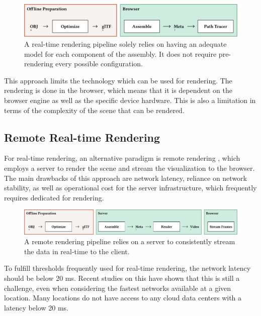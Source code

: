 \begin{figure}[H]
  \includegraphics[width=\columnwidth]{resources/cad-pipeline-online.png}
  \caption{A real-time rendering pipeline solely relies on having an adequate model for each component of the assembly. It does not require pre-rendering every possible configuration.}
  \label{fig:cad-online}
\end{figure}

This approach limits the technology which can be used for rendering. The rendering is done in the browser, which means that it is dependent on the browser engine as well as the specific device hardware. This is also a limitation in terms of the complexity of the scene that can be rendered.

\subsection*{Remote Real-time Rendering}

For real-time rendering, an alternative paradigm is remote rendering \cite{remoteRendering}, which employs a server to render the scene and stream the visualization to the browser. The main drawbacks of this approach are network latency, reliance on network stability, as well as operational cost for the server infrastructure, which frequently requires dedicated  for rendering.

\begin{figure}[H]
  \includegraphics[width=\columnwidth]{resources/cad-pipeline-remote.png}
  \caption{A remote rendering pipeline relies on a server to consistently stream the data in real-time to the client.}
  \label{fig:cad-remote}
\end{figure}

To fulfill thresholds frequently used for real-time rendering, the network latency should be below 20 ms. Recent studies on this have shown that this is still a challenge, even when considering the fastest networks available at a given location. Many locations do not have access to any cloud data centers with a latency below 20 ms. \cite{cloudLatency}

